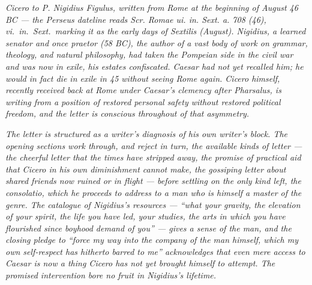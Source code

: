 
\textit{Cicero to P. Nigidius Figulus, written from Rome
at the beginning of August 46 BC --- the Perseus dateline
reads \textit{Scr. Romae ui. in. Sext. a. 708 (46)},
\textit{vi.\ in.\ Sext.}\ marking it as the early days of
Sextilis (August). Nigidius, a learned senator and once
praetor (58 BC), the author of a vast body of work on
grammar, theology, and natural philosophy, had taken the
Pompeian side in the civil war and was now in exile, his
estates confiscated. Caesar had not yet recalled him; he
would in fact die in exile in 45 without seeing Rome again.
Cicero himself, recently received back at Rome under
Caesar's clemency after Pharsalus, is writing from a
position of restored personal safety without restored
political freedom, and the letter is conscious throughout
of that asymmetry.}

\textit{The letter is structured as a writer's diagnosis of
his own writer's block. The opening sections work through,
and reject in turn, the available kinds of letter --- the
cheerful letter that the times have stripped away, the
promise of practical aid that Cicero in his own
diminishment cannot make, the gossiping letter about
shared friends now ruined or in flight --- before settling
on the only kind left, the consolatio, which he proceeds
to address to a man who is himself a master of the genre.
The catalogue of Nigidius's resources --- ``what your
gravity, the elevation of your spirit, the life you have
led, your studies, the arts in which you have flourished
since boyhood demand of you'' --- gives a sense of the man,
and the closing pledge to ``force my way into the company
of the man himself, which my own self-respect has hitherto
barred to me'' acknowledges that even mere access to Caesar
is now a thing Cicero has not yet brought himself to
attempt. The promised intervention bore no fruit in
Nigidius's lifetime.}
